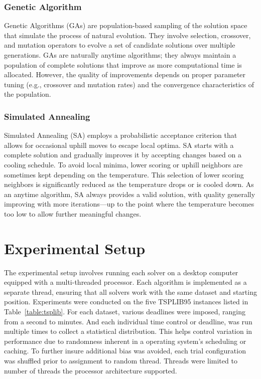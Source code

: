 \documentclass[11pt]{article}
\begin{document}
	\subsubsection{Genetic Algorithm}
	Genetic Algorithms (GAs) are population-based sampling of the solution space that simulate the process of natural evolution. They involve selection, crossover, and mutation operators to evolve a set of candidate solutions over multiple generations\cite{wikipedia_genetic_algorithm}. GAs are naturally anytime algorithms; they always maintain a population of complete solutions that improve as more computational time is allocated. However, the quality of improvements depends on proper parameter tuning (e.g., crossover and mutation rates) and the convergence characteristics of the population.
	
	\subsubsection{Simulated Annealing}
	Simulated Annealing (SA) employs a probabilistic acceptance criterion that allows for occasional uphill moves to escape local optima\cite{wikipedia_simulated_annealing}. SA starts with a complete solution and gradually improves it by accepting changes based on a cooling schedule. To avoid local minima, lower scoring or uphill neighbors are sometimes kept depending on the temperature. This selection of lower scoring neighbors is significantly reduced as the temperature drops or is cooled down. As an anytime algorithm, SA always provides a valid solution, with quality generally improving with more iterations—up to the point where the temperature becomes too low to allow further meaningful changes.
	
	\section{Experimental Setup}
	The experimental setup involves running each solver on a desktop computer equipped with a multi-threaded processor. Each algorithm is implemented as a separate thread, ensuring that all solvers work with the same dataset and starting position. Experiments were conducted on the five TSPLIB95 instances listed in Table~\ref{table:tsplib}. For each dataset, various deadlines were imposed, ranging from a second to minutes. And each individual time control or deadline, was run multiple times to collect a statistical distribution. This helps control variation in performance due to randomness inherent in a operating system's scheduling or caching. To further insure additional bias was avoided, each trial configuration was shuffled prior to assignment to random thread. Threads were limited to number of threads the processor architecture supported.
	
\end{document}
